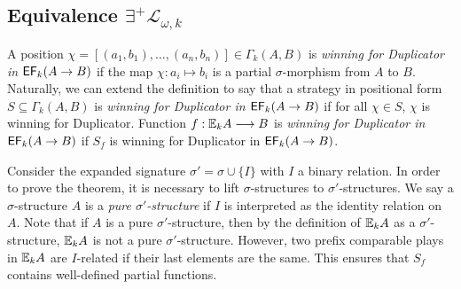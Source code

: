 \subsection{Equivalence $\exists^{+}\mathcal{L}_{\omega,k}$}
\begin{defn}
A position $\chi = [(a_{1},b_{1}),\dots,(a_{n},b_{n})] \in \Gamma_{k}(A,B)$ is \textit{winning for Duplicator in ${\mathsf{EF}_{k}(A \rightarrow B)}$} if the map $\chi:a_{i} \longmapsto b_{i}$ is a partial $\sigma$-morphism from $A$ to $B$.  
Naturally, we can extend the definition to say that a strategy in positional form $S \subseteq \Gamma_{k}(A,B)$ is \textit{winning for Duplicator in ${\mathsf{EF}_{k}(A \rightarrow B)}$} if for all $\chi \in S$, $\chi$ is winning for Duplicator. Function $f:{\mathbb{E}_{k}A} \longrightarrow B$ is \textit{winning for Duplicator in ${\mathsf{EF}_{k}(A \rightarrow B)}$} if $S_{f}$ is winning for Duplicator in ${\mathsf{EF}_{k}(A \rightarrow B)}$.
\end{defn}
Consider the expanded signature $\sigma' = \sigma \cup \{I\}$ with $I$ a binary relation. In order to prove the theorem, it is necessary to lift $\sigma$-structures to $\sigma'$-structures. We say a $\sigma$-structure $A$ is a \textit{pure $\sigma'$-structure} if $I$ is interpreted as the identity relation on $A$. Note that if $A$ is a pure $\sigma'$-structure, then by the definition of ${\mathbb{E}_{k}A}$ as a $\sigma'$-structure, ${\mathbb{E}_{k}A}$ is not a pure $\sigma'$-structure. However, two prefix comparable plays in ${\mathbb{E}_{k}A}$ are $I$-related if their last elements are the same. This ensures that $S_{f}$ contains well-defined partial functions.
